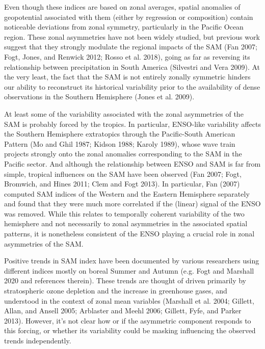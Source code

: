 \documentclass[smallextended]{svjour3}       %
\begin{document}
Even though these indices are based on zonal averages, spatial anomalies of geopotential associated with them (either by regression or composition) contain noticeable deviations from zonal symmetry, particularly in the Pacific Ocean region. These zonal asymmetries have not been widely studied, but previous work suggest that they strongly modulate the regional impacts of the SAM (Fan 2007; Fogt, Jones, and Renwick 2012; Rosso et al. 2018), going as far as reversing its relationship between precipitation in South America (Silvestri and Vera 2009). At the very least, the fact that the SAM is not entirely zonally symmetric hinders our ability to reconstruct its historical variability prior to the availability of dense observations in the Southern Hemisphere (Jones et al. 2009).

At least some of the variability associated with the zonal asymmetries of the SAM is probably forced by the tropics. In particular, ENSO-like variability affects the Southern Hemisphere extratopics through the Pacific-South American Pattern (Mo and Ghil 1987; Kidson 1988; Karoly 1989), whose wave train projects strongly onto the zonal anomalies corresponding to the SAM in the Pacific sector. And although the relationship between ENSO and SAM is far from simple, tropical influences on the SAM have been observed (Fan 2007; Fogt, Bromwich, and Hines 2011; Clem and Fogt 2013). In particular, Fan (2007) computed SAM indices of the Western and the Eastern Hemisphere separately and found that they were much more correlated if the (linear) signal of the ENSO was removed. While this relates to temporally coherent variability of the two hemisphere and not necessarily to zonal asymmetries in the associated spatial patterns, it is nonetheless consistent of the ENSO playing a crucial role in zonal asymmetries of the SAM.

Positive trends in SAM index have been documented by various researchers using different indices mostly on boreal Summer and Autumn (e.g. Fogt and Marshall 2020 and references therein). These trends are thought of driven primarily by stratospheric ozone depletion and the increase in greenhouse gases, and understood in the context of zonal mean variables (Marshall et al. 2004; Gillett, Allan, and Ansell 2005; Arblaster and Meehl 2006; Gillett, Fyfe, and Parker 2013). However, it's not clear how or if the asymmetric component responds to this forcing, or whether its variability could be masking influencing the observed trends independently.
\end{document}
